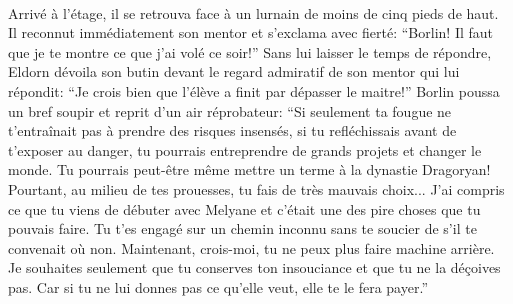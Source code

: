 \paragraph{}
Arrivé à l'étage, il se retrouva face à un lurnain de moins de cinq pieds de
haut. Il reconnut immédiatement son mentor et s'exclama avec fierté: ``Borlin!
Il faut que je te montre ce que j'ai volé ce soir!'' Sans lui laisser le
temps de répondre, Eldorn dévoila son butin devant le regard admiratif de son
mentor qui lui répondit: ``Je crois bien que l'élève a finit par dépasser le
maitre!'' Borlin poussa un bref soupir et reprit d'un air réprobateur: ``Si
seulement ta fougue ne t'entraînait pas à prendre des risques insensés, si tu
refléchissais avant de t'exposer au danger, tu pourrais entreprendre de grands
projets et changer le monde. Tu pourrais peut-être même mettre un terme à la
dynastie Dragoryan! Pourtant, au milieu de tes prouesses, tu fais de très
mauvais choix... J'ai compris ce que tu viens de débuter avec Melyane et
c'était une des pire choses que tu pouvais faire. Tu t'es engagé sur un chemin
inconnu sans te soucier de s'il te convenait où non. Maintenant, crois-moi, tu
ne peux plus faire machine arrière. Je souhaites seulement que tu conserves
ton insouciance et que tu ne la déçoives pas. Car si tu ne lui donnes pas ce
qu'elle veut, elle te le fera payer.''


